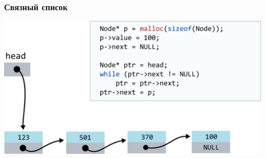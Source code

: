 \documentclass[10pt,pdf,hyperref={unicode}]{beamer}
\begin{document}
\begin{frame}[fragile]
\frametitle{Связный список}
\begin{center}
\includegraphics[width=\imageSizeMult\linewidth]{../images/codelist/codelistf_insert12.png}
\end{center}
\end{frame}
\end{document}
